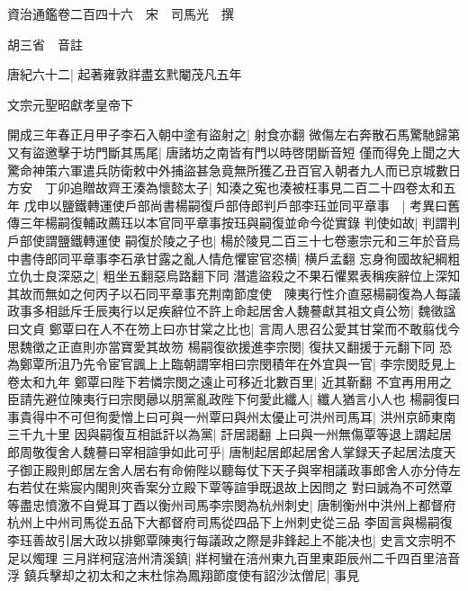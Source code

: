 資治通鑑卷二百四十六　宋　司馬光　撰

胡三省　音註

唐紀六十二|{
	起著雍敦牂盡玄黓閹茂凡五年}


文宗元聖昭獻孝皇帝下

開成三年春正月甲子李石入朝中塗有盜射之|{
	射食亦翻}
微傷左右奔散石馬驚馳歸第又有盜邀擊于坊門斷其馬尾|{
	唐諸坊之南皆有門以時啓閉斷音短}
僅而得免上聞之大驚命神策六軍遣兵防衛敕中外捕盜甚急竟無所獲乙丑百官入朝者九人而已京城數日方安　丁卯追贈故齊王湊為懷懿太子|{
	知湊之寃也湊被枉事見二百二十四卷太和五年}
戊申以鹽鐵轉運使戶部尚書楊嗣復戶部侍郎判戶部李珏並同平章事　|{
	考異曰舊傳三年楊嗣復輔政薦珏以本官同平章事按珏與嗣復並命今從實錄}
判使如故|{
	判謂判戶部使謂鹽鐵轉運使}
嗣復於陵之子也|{
	楊於陵見二百三十七卷憲宗元和三年於音烏}
中書侍郎同平章事李石承甘露之亂人情危懼宦官恣横|{
	横戶孟翻}
忘身徇國故紀綱粗立仇士良深惡之|{
	粗坐五翻惡烏路翻下同}
潛遣盜殺之不果石懼累表稱疾辭位上深知其故而無如之何丙子以石同平章事充荆南節度使　陳夷行性介直惡楊嗣復為人每議政事多相詆斥壬辰夷行以足疾辭位不許上命起居舍人魏謩獻其祖文貞公笏|{
	魏徵諡曰文貞}
鄭覃曰在人不在笏上曰亦甘棠之比也|{
	言周人思召公愛其甘棠而不敢翦伐今思魏徵之正直則亦當寶愛其故笏}
楊嗣復欲援進李宗閔|{
	復扶又翻援于元翻下同}
恐為鄭覃所沮乃先令宦官諷上上臨朝謂宰相曰宗閔積年在外宜與一官|{
	李宗閔貶見上卷太和九年}
鄭覃曰陛下若憐宗閔之遠止可移近北數百里|{
	近其靳翻}
不宜再用用之臣請先避位陳夷行曰宗閔曏以朋黨亂政陛下何愛此纖人|{
	纖人猶言小人也}
楊嗣復曰事貴得中不可但徇愛憎上曰可與一州覃曰與州太優止可洪州司馬耳|{
	洪州京師東南三千九十里}
因與嗣復互相詆訐以為黨|{
	訐居謁翻}
上曰與一州無傷覃等退上謂起居郎周敬復舍人魏謩曰宰相諠爭如此可乎|{
	唐制起居郎起居舍人掌録天子起居法度天子御正殿則郎居左舍人居右有命俯陛以聽每仗下天子與宰相議政事郎舍人亦分侍左右若仗在紫宸内閣則夾香案分立殿下覃等諠爭既退故上因問之}
對曰誠為不可然覃等盡忠憤激不自覺耳丁酉以衡州司馬李宗閔為杭州刺史|{
	唐制衡州中洪州上都督府杭州上中州司馬從五品下大都督府司馬從四品下上州刺史從三品}
李固言與楊嗣復李珏善故引居大政以排鄭覃陳夷行每議政之際是非鋒起上不能决也|{
	史言文宗明不足以燭理}
三月牂柯寇涪州清溪鎮|{
	牂柯蠻在涪州東九百里東距辰州二千四百里涪音浮}
鎮兵擊却之初太和之末杜悰為鳳翔節度使有詔沙汰僧尼|{
	事見}



